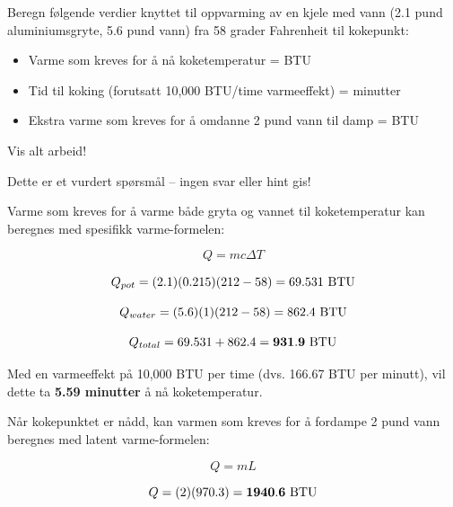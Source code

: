 

Beregn følgende verdier knyttet til oppvarming av en kjele med vann (2.1 pund aluminiumsgryte, 5.6 pund vann) fra 58 grader Fahrenheit til kokepunkt:

\vskip 10pt

\begin{itemize}
\item{} Varme som kreves for å nå koketemperatur = \underbar{\hskip 50pt} BTU
\vskip 5pt
\item{} Tid til koking (forutsatt 10,000 BTU/time varmeeffekt) = \underbar{\hskip 50pt} minutter
\vskip 5pt
\item{} Ekstra varme som kreves for å omdanne 2 pund vann til damp = \underbar{\hskip 50pt} BTU
\end{itemize}

\vskip 10pt

\noindent
Vis alt arbeid!

\vfil 

\eject






Dette er et vurdert spørsmål -- ingen svar eller hint gis!







Varme som kreves for å varme både gryta og vannet til koketemperatur kan beregnes med spesifikk varme-formelen:

$$Q = mc \Delta T$$

$$Q_{pot} = (2.1) (0.215) (212-58) = 69.531 \hbox{ BTU}$$

$$Q_{water} = (5.6) (1) (212-58) = 862.4 \hbox{ BTU}$$

$$Q_{total} = 69.531 + 862.4 = {\bf 931.9 \hbox{ BTU}}$$

\vskip 10pt

Med en varmeeffekt på 10,000 BTU per time (dvs. 166.67 BTU per minutt), vil dette ta {\bf 5.59 minutter} å nå koketemperatur.

\vskip 10pt

Når kokepunktet er nådd, kan varmen som kreves for å fordampe 2 pund vann beregnes med latent varme-formelen:

$$Q = mL$$

$$Q = (2)(970.3) = {\bf 1940.6 \hbox{ BTU}}$$




